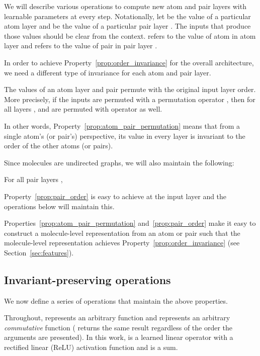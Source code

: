 We will describe various operations to compute new atom and pair layers with
learnable parameters at every step. Notationally, let  be the value of a
particular atom layer  and  be the value of a particular pair layer
. The inputs that produce those values should be clear from the
context.  refers to the value of atom  in atom layer  and
 refers to the value of pair  in pair layer .

In order to achieve Property~\ref{prop:order_invariance} for the overall
architecture, we need a different type of invariance for each atom and pair
layer.

\begin{property}
  \label{prop:atom_pair_permutation}
  The values of an atom layer and pair permute with the original input layer
  order. More precisely, if the inputs are permuted with a permutation operator
  , then for all layers ,  and  are permuted with operator
   as well.
\end{property}

In other words, Property~\ref{prop:atom_pair_permutation} means that from a
single atom's (or pair's) perspective, its value in every layer is invariant to
the order of the other atoms (or pairs).

Since molecules are undirected graphs, we will also maintain the following:
\begin{property}
  \label{prop:pair_order}
  For all pair layers , 
\end{property}
Property~\ref{prop:pair_order} is easy to achieve at the input layer and the
operations below will maintain this.

Properties~\ref{prop:atom_pair_permutation} and~\ref{prop:pair_order} make it
easy to construct a molecule-level representation from an atom or pair such that
the molecule-level representation achieves
Property~\ref{prop:order_invariance} (see Section~\ref{sec:features}).

\subsection{Invariant-preserving operations}\label{sec:operations}

We now define a series of operations that maintain the above properties.

Throughout,  represents an arbitrary function and  represents an arbitrary
\emph{commutative} function ( returns the same result regardless of the
order the arguments are presented). In this work,  is a learned linear
operator with a rectified linear (ReLU) activation function and  is a sum.

